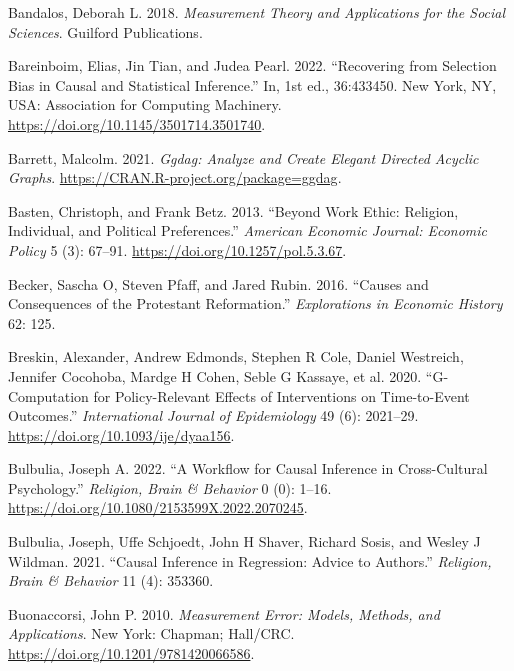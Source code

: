 \documentclass[
  singlecolumn]{article}
\newlength{\cslhangindent}
\newlength{\cslentryspacingunit} %
\newenvironment{CSLReferences}[2] %
 {%
  \setlength{\parindent}{0pt}
  \ifodd #1
  \let\oldpar\par
  \def\par{\hangindent=\cslhangindent\oldpar}
  \fi
  \setlength{\parskip}{#2\cslentryspacingunit}
 }%
 {}
\begin{document}
\hypertarget{refs}{}
\begin{CSLReferences}{1}{0}
\leavevmode{}%
Bandalos, Deborah L. 2018. \emph{Measurement Theory and Applications for
the Social Sciences}. Guilford Publications.

\leavevmode{}%
Bareinboim, Elias, Jin Tian, and Judea Pearl. 2022. {``Recovering from
Selection Bias in Causal and Statistical Inference.''} In, 1st ed.,
36:433450. New York, NY, USA: Association for Computing Machinery.
\url{https://doi.org/10.1145/3501714.3501740}.

\leavevmode{}%
Barrett, Malcolm. 2021. \emph{Ggdag: Analyze and Create Elegant Directed
Acyclic Graphs}. \url{https://CRAN.R-project.org/package=ggdag}.

\leavevmode{}%
Basten, Christoph, and Frank Betz. 2013. {``Beyond Work Ethic: Religion,
Individual, and Political Preferences.''} \emph{American Economic
Journal: Economic Policy} 5 (3): 67--91.
\url{https://doi.org/10.1257/pol.5.3.67}.

\leavevmode{}%
Becker, Sascha O, Steven Pfaff, and Jared Rubin. 2016. {``Causes and
Consequences of the Protestant Reformation.''} \emph{Explorations in
Economic History} 62: 125.

\leavevmode{}%
Breskin, Alexander, Andrew Edmonds, Stephen R Cole, Daniel Westreich,
Jennifer Cocohoba, Mardge H Cohen, Seble G Kassaye, et al. 2020.
{``G-Computation for Policy-Relevant Effects of Interventions on
Time-to-Event Outcomes.''} \emph{International Journal of Epidemiology}
49 (6): 2021--29. \url{https://doi.org/10.1093/ije/dyaa156}.

\leavevmode{}%
Bulbulia, Joseph A. 2022. {``A Workflow for Causal Inference in
Cross-Cultural Psychology.''} \emph{Religion, Brain \& Behavior} 0 (0):
1--16. \url{https://doi.org/10.1080/2153599X.2022.2070245}.

\leavevmode{}%
Bulbulia, Joseph, Uffe Schjoedt, John H Shaver, Richard Sosis, and
Wesley J Wildman. 2021. {``Causal Inference in Regression: Advice to
Authors.''} \emph{Religion, Brain \& Behavior} 11 (4): 353360.

\leavevmode{}%
Buonaccorsi, John P. 2010. \emph{Measurement Error: Models, Methods, and
Applications}. New York: Chapman; Hall/CRC.
\url{https://doi.org/10.1201/9781420066586}.


\end{CSLReferences}
\end{document}
